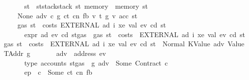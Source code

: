\begin{isabellebody}
\ \ \ \ \ \ \ {\isachardoublequoteopen}st{\isacharprime}{\kern0pt}\ {\isacharequal}{\kern0pt}\ st{\isacharprime}{\kern0pt}{\isacharprime}{\kern0pt}{\isasymlparr}stack{\isacharcolon}{\kern0pt}{\isacharequal}{\kern0pt}stack\ st{\isacharcomma}{\kern0pt}\ memory\ {\isacharcolon}{\kern0pt}{\isacharequal}{\kern0pt}\ memory\ st{\isasymrparr}{\isachardoublequoteclose}\isanewline
\ \ \ \ {\isacharbar}{\kern0pt}\ {\isacharparenleft}{\kern0pt}None{\isacharparenright}{\kern0pt}\ adv\ c\ g\ ct\ cn\ fb{\isacharprime}{\kern0pt}\ v\ t\ g{\isacharprime}{\kern0pt}\ v{\isacharprime}{\kern0pt}\ acc\ st{\isacharprime}{\kern0pt}{\isacharprime}{\kern0pt}\isanewline
\ \ \ \ \ {\isachardoublequoteopen}gas\ st\ {\isachargreater}{\kern0pt}\ costs\ {\isacharparenleft}{\kern0pt}EXTERNAL\ ad{\isacharprime}{\kern0pt}\ i\ xe\ val{\isacharparenright}{\kern0pt}\ ev\ cd\ st{\isachardoublequoteclose}\isanewline
\ \ \ \ \ \ \ {\isachardoublequoteopen}expr\ ad{\isacharprime}{\kern0pt}\ ev\ cd\ {\isacharparenleft}{\kern0pt}st{\isasymlparr}gas\ {\isacharcolon}{\kern0pt}{\isacharequal}{\kern0pt}\ gas\ st\ {\isacharminus}{\kern0pt}\ costs\ \ {\isacharparenleft}{\kern0pt}EXTERNAL\ ad{\isacharprime}{\kern0pt}\ i\ xe\ val{\isacharparenright}{\kern0pt}\ ev\ cd\ st{\isasymrparr}{\isacharparenright}{\kern0pt}\ {\isacharparenleft}{\kern0pt}gas\ st\ {\isacharminus}{\kern0pt}\ costs\ \ {\isacharparenleft}{\kern0pt}EXTERNAL\ ad{\isacharprime}{\kern0pt}\ i\ xe\ val{\isacharparenright}{\kern0pt}\ ev\ cd\ st{\isacharparenright}{\kern0pt}\ {\isacharequal}{\kern0pt}\ Normal\ {\isacharparenleft}{\kern0pt}{\isacharparenleft}{\kern0pt}KValue\ adv{\isacharcomma}{\kern0pt}\ Value\ TAddr{\isacharparenright}{\kern0pt}{\isacharcomma}{\kern0pt}\ g{\isacharparenright}{\kern0pt}{\isachardoublequoteclose}\isanewline
\ \ \ \ \ \ \ {\isachardoublequoteopen}adv\ {\isasymnoteq}\ address\ ev{\isachardoublequoteclose}\isanewline
\ \ \ \ \ \ \ {\isachardoublequoteopen}type\ {\isacharparenleft}{\kern0pt}accounts\ {\isacharparenleft}{\kern0pt}st{\isasymlparr}gas\ {\isacharcolon}{\kern0pt}{\isacharequal}{\kern0pt}\ g{\isasymrparr}{\isacharparenright}{\kern0pt}\ adv{\isacharparenright}{\kern0pt}\ {\isacharequal}{\kern0pt}\ Some\ {\isacharparenleft}{\kern0pt}Contract\ c{\isacharparenright}{\kern0pt}{\isachardoublequoteclose}\isanewline
\ \ \ \ \ \ \ {\isachardoublequoteopen}ep\ {\isachardollar}{\kern0pt}{\isachardollar}{\kern0pt}\ c\ {\isacharequal}{\kern0pt}\ Some\ {\isacharparenleft}{\kern0pt}ct{\isacharcomma}{\kern0pt}\ cn{\isacharcomma}{\kern0pt}\ fb{\isacharprime}{\kern0pt}{\isacharparenright}{\kern0pt}{\isachardoublequoteclose}\isanewline

\end{isabellebody}
